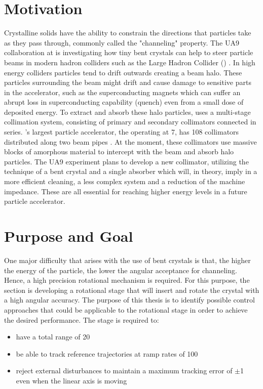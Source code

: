 \section{Motivation}
Crystalline solids have the ability to constrain the directions that particles take as they pass through, commonly called the "channeling" property. The UA9 collaboration at \abbrCERN is investigating how tiny bent crystals can help to steer particle beams in modern hadron colliders such as the Large Hadron Collider (\abbrLHC) \citep{scandale2016observation}. In high energy colliders particles tend to drift outwards creating a beam halo. These particles surrounding the beam might drift and cause damage to sensitive parts in the accelerator, such as the superconducting magnets which can suffer an abrupt loss in superconducting capability (quench) even from a small dose of deposited energy. To extract and absorb these halo particles, \abbrCERN uses a multi-stage collimation system, consisting of primary and secondary collimators connected in series. \abbrCERN's largest particle accelerator, the \abbrLHC operating at \unit{7}{\tera\electronvolt}, has 108 collimators distributed along two beam pipes \citep{CrystalCollimation:2015}. At the moment, these collimators use massive blocks of amorphous material to intercept with the beam and absorb halo particles. The UA9 experiment plans to develop a new collimator, utilizing the technique of a bent crystal and a single absorber which will, in theory, imply in a more efficient cleaning, a less complex system and a reduction of the machine impedance. These are all essential for reaching higher energy levels in a future particle accelerator.

\section{Purpose and Goal}\label{sec:goal}
One major difficulty that arises with the use of bent crystals is that, the higher the energy of the particle, the lower the angular acceptance for channeling. Hence, a high precision rotational mechanism is required. For this purpose, the \abbrENSTIECE section is developing a rotational stage that will insert and rotate the crystal with a high angular accuracy. The purpose of this thesis is to identify possible control approaches that could be applicable to the rotational stage in order to achieve the desired performance. The stage is required to:
\begin{itemize}
  \item have a total range of \unit{20}{\milli\rad}
  \item be able to track reference trajectories at ramp rates of \unit{100}{\micro\radianpersecond}
  \item reject external disturbances to maintain a maximum tracking error of $\pm$\unit{1}{\micro\rad} even when the linear axis is moving
\end{itemize}

